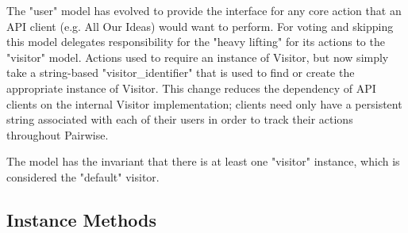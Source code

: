 \documentclass[11pt]{book}
\begin{document}
The "user" model has evolved to provide the interface for any core action that an API client (e.g. All Our Ideas) would want to perform.  For voting and skipping this model delegates responsibility for the "heavy lifting" for its actions to the "visitor" model.  Actions used to require an instance of Visitor, but now simply take a string-based "visitor\_identifier" that is used to find or create the appropriate instance of Visitor.  This change reduces the dependency of API clients on the internal Visitor implementation; clients need only have a persistent string associated with each of their users in order to track their actions throughout Pairwise.

The model has the invariant that there is at least one "visitor" instance, which is considered the "default" visitor.


\subsection{Instance Methods}
\end{document}
